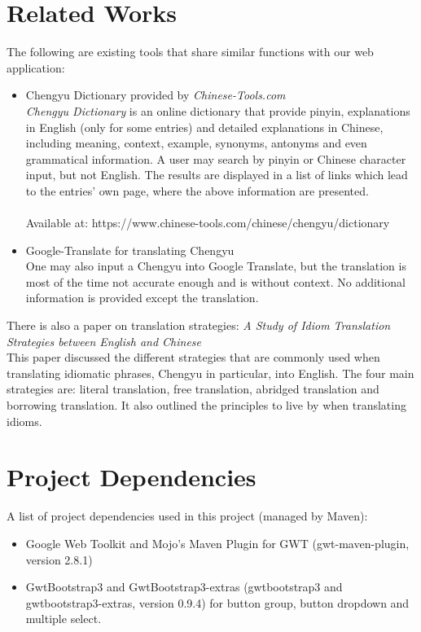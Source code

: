 \documentclass[11pt]{article} %
\begin{document}
\section{Related Works}
The following are existing tools that share similar functions with our web application:
\begin{itemize}
\item Chengyu Dictionary provided by \textit{Chinese-Tools.com}\\
\textit{Chengyu Dictionary} is an online dictionary that provide pinyin, explanations in English (only for some entries) and detailed explanations in Chinese, including meaning, context, example, synonyms, antonyms and even grammatical information. A user may search by pinyin or Chinese character input, but not English. The results are displayed in a list of links which lead to the entries' own page, where the above information are presented.\\
\\
Available at: https://www.chinese-tools.com/chinese/chengyu/dictionary\\
\item Google-Translate for translating Chengyu\\
One may also input a Chengyu into Google Translate, but the translation is most of the time not accurate enough and is without context. No additional information is provided except the translation. \\
\end{itemize}
There is also a paper on translation strategies: \textit{A Study of Idiom Translation Strategies between English and Chinese}\\
This paper discussed the different strategies that are commonly used when translating idiomatic phrases, Chengyu in particular, into English. The four main strategies are: literal translation, free translation, abridged translation and borrowing translation. It also outlined the principles to live by when translating idioms.


\section{Project Dependencies}
A list of project dependencies used in this project (managed by Maven):
\begin{itemize}
\item Google Web Toolkit and Mojo's Maven Plugin for GWT  (gwt-maven-plugin, version 2.8.1)
\item GwtBootstrap3 and GwtBootstrap3-extras (gwtbootstrap3 and gwtbootstrap3-extras, version 0.9.4) for button group, button dropdown and multiple select.
\end{itemize}
\end{document}
